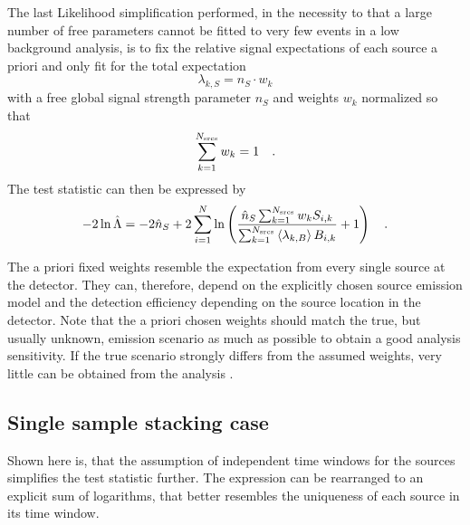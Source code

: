 The last Likelihood simplification performed, in the necessity to that a large number of free parameters cannot be fitted to very few events in a low background analysis, is to fix the relative signal expectations of each source a priori and only fit for the total expectation
\begin{equation}
  \lambda_{k,S} = n_S \cdot w_k
\end{equation}
with a free global signal strength parameter $n_S$ and weights $w_k$ normalized so that
\begin{equation}
  \sum_{k=1}^{N_\text{srcs}} w_k = 1
  \quad\text{.}
\end{equation}
The test statistic can then be expressed by
\begin{equation}
  -2\ln\hat{\Lambda}
  = -2\hat{n}_S +
      2\sum_{i=1}^N \ln\left(
        \frac{\hat{n}_S \sum_{k=1}^{N_\text{srcs}} w_k S_{i,k}}
             {\sum_{k=1}^{N_\text{srcs}}\Braket{\lambda_{k,B}} B_{i,k}}
        + 1
      \right)
  \quad\text{.}
\end{equation}

The a priori fixed weights resemble the expectation from every single source at the detector.
They can, therefore, depend on the explicitly chosen source emission model and the detection efficiency depending on the source location in the detector.
Note that the a priori chosen weights should match the true, but usually unknown, emission scenario as much as possible to obtain a good analysis sensitivity.
If the true scenario strongly differs from the assumed weights, very little can be obtained from the analysis .


\subsection{Single sample stacking case}
Shown here is, that the assumption of independent time windows for the sources simplifies the test statistic further.
The expression can be rearranged to an explicit sum of logarithms, that better resembles the uniqueness of each source in its time window.

